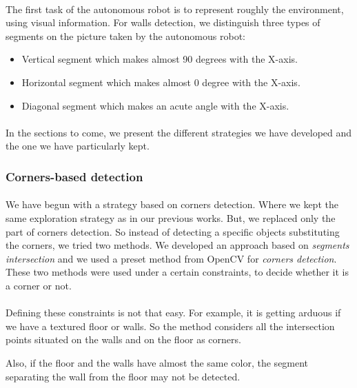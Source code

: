 \documentclass[12pt]{report}
\begin{document}
	 \paragraph{}
	 The first task of the autonomous robot is to represent roughly the environment, using visual information. For walls detection, we distinguish three types of segments on the picture taken by the autonomous robot:
	 \begin{itemize}
	 	\item Vertical segment which makes almost 90 degrees with the X-axis.
	 	\item Horizontal segment which makes almost 0 degree with the  X-axis.
	 	\item Diagonal segment which makes an acute angle with the X-axis.
	 \end{itemize} 
	 
	 
	 \paragraph{}
	 In the sections to come, we present the different strategies we have developed and the one we have particularly kept.
	 
	 \subsubsection{Corners-based detection}
	 \paragraph{}
	 We have begun with a strategy based on corners detection. Where we kept the same exploration strategy as in our previous works. But, we replaced only the part of corners detection. So instead of detecting a specific objects substituting the corners, we tried two methods. We developed an approach based on \textit{segments intersection} and we used a preset method from OpenCV for \textit{corners detection}. These two methods were used under a certain constraints, to decide whether it is a corner or not.
	 \paragraph{}
	 Defining these constraints is not that easy. For example, it is getting arduous if we have a textured floor or walls. So the method considers all the intersection points situated on the walls and on the floor as corners. 
	
	 Also, if the floor and the walls have almost the same color, the segment separating the wall from the floor may not be detected.
	 
\end{document}
